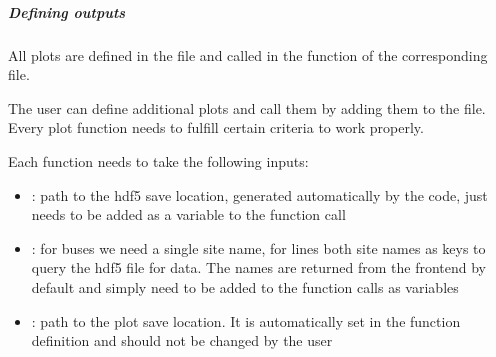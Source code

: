 \documentclass[letterpaper,10pt,english]{sphinxmanual}
\begin{document}
\subparagraph{Defining outputs}
\label{\detokenize{docs_gui/usage/urbs_results:defining-outputs}}
\begin{DUlineblock}{0em}
\item[] All plots are defined in the file  and called in the function  of the corresponding  file.
\item[] The user can define additional plots and call them by adding them to the  file. Every plot function needs to fulfill certain criteria to work properly.
\item[] Each function needs to take the following inputs:
\end{DUlineblock}
\begin{itemize}
\item {} 
\sphinxAtStartPar
{}: path to the hdf5 save location, generated automatically by the  code, just needs to be added as a variable to the function call

\item {} 
\sphinxAtStartPar
{}: for buses we need a single site name, for lines both site names as keys to query the hdf5 file for data. The names are returned from the frontend by default and simply need to be added to the function calls as variables

\item {} 
\sphinxAtStartPar
{}: path to the plot save location. It is automatically set in the function definition and should not be changed by the user

\end{itemize}
\end{document}
